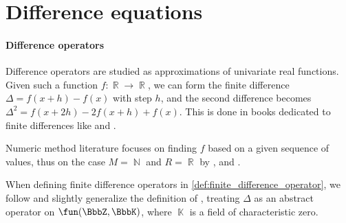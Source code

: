 \section{Difference equations}\label{sec:difference_equations}

\paragraph{Difference operators}

\begin{remark}\label{rem:finite_difference_literature_overview}
  Difference operators are studied as approximations of univariate real functions. Given such a function \( f: \BbbR \to \BbbR \), we can form the finite difference \( \Delta = f(x + h) - f(x) \) with step \( h \), and the second difference becomes \( \Delta^2 = f(x + 2h) - 2f(x + h) + f(x) \). This is done in books dedicated to finite differences like \textcite[3]{Jordan1950FiniteDifferences} and \textcite[12]{Гельфонд1959ИсчислениеКонечныхРазностей}.

  Numeric method literature focuses on finding \( f \) based on a given sequence of values, thus on the case \( M = \BbbN \) and \( R = \BbbR \) by \textcite[5]{LevyLessman1961FiniteDifferenceEquations}, \textcite[65]{БахваловЖидковКобельков2015ЧисленныеМетоды} and \textcite[21]{Боянов2008ЧислениМетоди}.

  When defining finite difference operators in \cref{def:finite_difference_operator}, we follow and slightly generalize the definition of \textcite[77]{Stanley2012EnumerativeCombinatoricsVol1}, treating \( \Delta \) as an abstract operator on \( \fun(\BbbZ, \BbbK) \), where \( \BbbK \) is a field of characteristic zero.
\end{remark}

